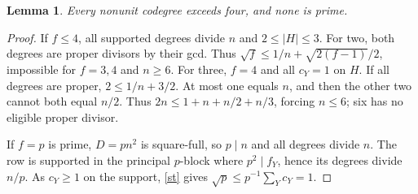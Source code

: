 \documentclass[11pt]{amsart}
\numberwithin{equation}{section}
\newtheorem{lemma}[theorem]{Lemma}
\begin{document}
\begin{lemma}\label{small}
Every nonunit codegree exceeds four, and none is prime.
\end{lemma}
\begin{proof}
If $f\le4$, all supported degrees divide $n$ and $2\le|H|\le3$.
For two, both degrees are proper divisors by their gcd. Thus
$\sqrt f\le1/n+\sqrt{2(f-1)}/2$, impossible for $f=3,4$ and $n\ge6$.
For three, $f=4$ and all $c_Y=1$ on $H$. If all degrees are proper,
$2\le1/n+3/2$. At most one equals $n$, and then the other two cannot both
equal $n/2$. Thus $2n\le1+n+n/2+n/3$, forcing $n\le6$; six has no
eligible proper divisor.

If $f=p$ is prime, $D=pn^2$ is square-full, so $p\mid n$ and all
degrees divide $n$. The row is supported in the principal $p$-block
where $p^2\mid f_Y$, hence its degrees divide $n/p$. As $c_Y\ge1$
on the support, \eqref{st} gives $\sqrt p\le p^{-1}\sum_Yc_Y=1$.
\end{proof}
\end{document}
